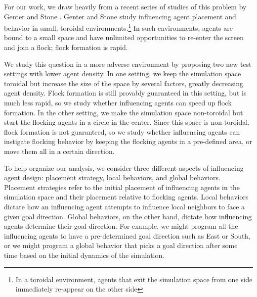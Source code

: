 
For our work, we draw heavily from a recent series of studies of this problem by
Genter and Stone \cite{genter2013backsearch, genter2013visionstationary, 
genter2014neighborsorientherd, genter2015placement, genter2016facegoalfacecurrent, 
genter201612steplookahead, genterthesis}.
Genter and Stone study influencing agent placement and behavior in small,
toroidal environments.\footnote{In a toroidal environment, agents that exit the
simulation space from one side immediately re-appear on the other side}
In such environments, agents are bound to a small space and have unlimited 
opportunities to re-enter the screen and join a flock; flock formation is rapid.

We study this question in a more adverse environment by proposing two new test 
settings with lower agent density.
In one setting, we keep the simulation space toroidal but increase the size of
the space by several factors, greatly decreasing agent density.
Flock formation is still provably guaranteed in this setting, but is much less
rapid, so we study whether influencing agents can speed up flock formation.
In the other setting, we make the simulation space non-toroidal but start the
flocking agents in a circle in the center.
Since this space is non-toroidal, flock formation is not guaranteed, so we
study whether influencing agents can instigate flocking behavior by keeping the
flocking agents in a pre-defined area, or move them all in a certain direction.

To help organize our analysis, we consider three different aspects of
influencing agent design: placement strategy, local behaviors, and global
behaviors.
Placement strategies refer to the initial placement of influencing agents in the
simulation space and their placement relative to flocking agents.
Local behaviors dictate how an influencing agent attempts to influence local
neighbors to face a given goal direction.
Global behaviors, on the other hand, dictate how influencing agents determine
their goal direction.
For example, we might program all the influencing agents to have a
pre-determined goal direction such as East or South, or we might program a
global behavior that picks a goal direction after some time based on the
initial dynamics of the simulation.

